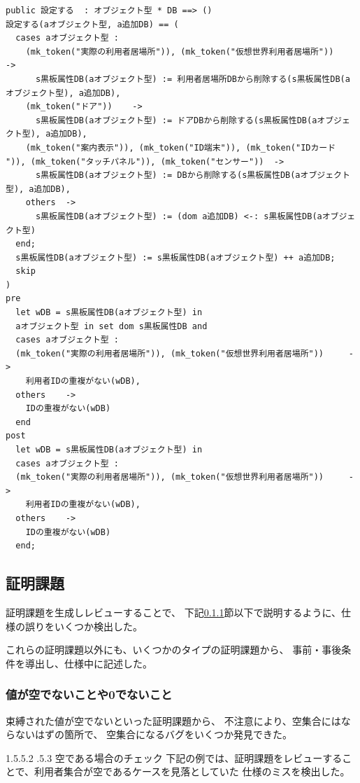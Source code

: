 \documentclass[a4paper,8pt]{jsarticle}
\makeatletter
\renewcommand{\paragraph}{\@startsection{paragraph}{4}{\z@}%
  {1.5\Cvs \@plus.5\Cdp \@minus.2\Cdp}%
  {.5\Cvs \@plus.3\Cdp}%
  {\reset@font\normalsize\bfseries}}
\makeatother
\begin{document}
\begin{verbatim}
public 設定する  : オブジェクト型 * DB ==> ()
設定する(aオブジェクト型, a追加DB) == (
  cases aオブジェクト型 :
    (mk_token("実際の利用者居場所")), (mk_token("仮想世界利用者居場所"))		->
      s黒板属性DB(aオブジェクト型) := 利用者居場所DBから削除する(s黒板属性DB(aオブジェクト型), a追加DB),
    (mk_token("ドア"))	-> 
      s黒板属性DB(aオブジェクト型) := ドアDBから削除する(s黒板属性DB(aオブジェクト型), a追加DB),
    (mk_token("案内表示")), (mk_token("ID端末")), (mk_token("IDカード ")), (mk_token("タッチパネル")), (mk_token("センサー"))	->
      s黒板属性DB(aオブジェクト型) := DBから削除する(s黒板属性DB(aオブジェクト型), a追加DB),
    others	->
      s黒板属性DB(aオブジェクト型) := (dom a追加DB) <-: s黒板属性DB(aオブジェクト型)
  end;
  s黒板属性DB(aオブジェクト型) := s黒板属性DB(aオブジェクト型) ++ a追加DB;
  skip
)
pre
  let wDB = s黒板属性DB(aオブジェクト型) in
  aオブジェクト型 in set dom s黒板属性DB and
  cases aオブジェクト型 :
  (mk_token("実際の利用者居場所")), (mk_token("仮想世界利用者居場所"))		->
    利用者IDの重複がない(wDB),
  others	->
    IDの重複がない(wDB)
  end
post
  let wDB = s黒板属性DB(aオブジェクト型) in
  cases aオブジェクト型 :
  (mk_token("実際の利用者居場所")), (mk_token("仮想世界利用者居場所"))		->
    利用者IDの重複がない(wDB),
  others	->
    IDの重複がない(wDB)
  end;
\end{verbatim}

\subsection {証明課題}
証明課題を生成しレビューすることで、
下記\ref{subusubsec:notNil}節以下で説明するように、仕様の誤りをいくつか検出した。

これらの証明課題以外にも、いくつかのタイプの証明課題から、
事前・事後条件を導出し、仕様中に記述した。

\subsubsection{値が空でないことや0でないこと}
\label{subusubsec:notNil}
束縛された値が空でないといった証明課題から、
不注意により、空集合にはならないはずの箇所で、
空集合になるバグをいくつか発見できた。

\paragraph{空である場合のチェック}
下記の例では、証明課題をレビューすることで、利用者集合が空であるケースを見落としていた
仕様のミスを検出した。
\end{document}
